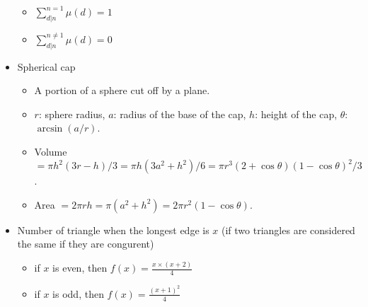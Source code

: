 \documentclass[10pt, a4paper, twocolumn, oneside]{article}
\begin{document}
\begin{itemize}
\begin{itemize}
  \item $\sum_{d \vert n}^{n=1} \mu (d)  = 1$
  \item $\sum_{d \vert n}^{n \neq 1} \mu (d)  = 0$
\end{itemize}
\item Spherical cap
\begin{itemize}
    \itemsep-0.5em
  \item A portion of a sphere cut off by a plane.
  \item $r$: sphere radius, $a$: radius of the base of the cap, $h$: height of the cap, $\theta$: $\arcsin(a/r)$.
  \item Volume $=\pi h^2(3r-h)/3=\pi h(3a^2+h^2)/6=\pi r^3(2+\cos\theta)(1-\cos\theta)^2/3$.
  \item Area $=2\pi rh=\pi(a^2+h^2)=2\pi r^2(1-\cos\theta)$.
\end{itemize}
\item Number of triangle when the longest edge is $x$ (if two triangles are considered the same if they are congurent)
\begin{itemize}
    \itemsep-0.5em
  \item if $x$ is even, then $f(x) = \frac{x \times (x + 2)}{4}$
  \item if $x$ is odd, then $f(x) = \frac{(x + 1)^2}{4}$
\end{itemize}
\end{itemize}
\end{document}
